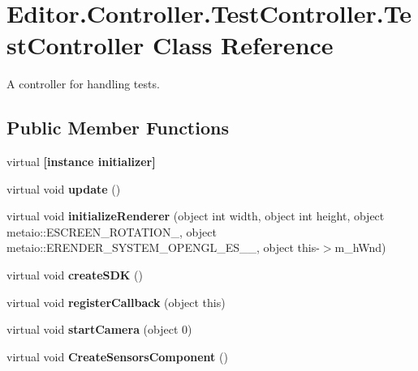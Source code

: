 \section{Editor.\-Controller.\-Test\-Controller.\-Test\-Controller Class Reference}
\label{class_editor_1_1_controller_1_1_test_controller_1_1_test_controller}


A controller for handling tests.  


\subsection*{Public Member Functions}
\begin{DoxyCompactItemize}
\item 
virtual {\bfseries [instance initializer]}\label{class_editor_1_1_controller_1_1_test_controller_1_1_test_controller_a5a748c8b3b9fe0d560d4e04d8918c494}

\item 
virtual void {\bfseries update} ()\label{class_editor_1_1_controller_1_1_test_controller_1_1_test_controller_a2b8d33e941ae8ab65f1da5ef0b8ca894}

\item 
virtual void {\bfseries initialize\-Renderer} (object int width, object int height, object metaio\-::\-E\-S\-C\-R\-E\-E\-N\-\_\-\-R\-O\-T\-A\-T\-I\-O\-N\-\_, object metaio\-::\-E\-R\-E\-N\-D\-E\-R\-\_\-\-S\-Y\-S\-T\-E\-M\-\_\-\-O\-P\-E\-N\-G\-L\-\_\-\-E\-S\-\_\-\_, object this-\/$>$m\-\_\-h\-Wnd)\label{class_editor_1_1_controller_1_1_test_controller_1_1_test_controller_aa7a7d60f7587bb2862ef2a79ee0f89bc}

\item 
virtual void {\bfseries create\-S\-D\-K} ()\label{class_editor_1_1_controller_1_1_test_controller_1_1_test_controller_adc5b14db22e38ffc097506bb5efed194}

\item 
virtual void {\bfseries register\-Callback} (object this)\label{class_editor_1_1_controller_1_1_test_controller_1_1_test_controller_a83498f88c2b265dbc20968a331d527d0}

\item 
virtual void {\bfseries start\-Camera} (object 0)\label{class_editor_1_1_controller_1_1_test_controller_1_1_test_controller_af6e1bceb576db556d46ee03390b825b7}

\item 
virtual void {\bfseries Create\-Sensors\-Component} ()\label{class_editor_1_1_controller_1_1_test_controller_1_1_test_controller_af4a3010516485dde56cd57f9487d24d9}


\end{DoxyCompactItemize}
